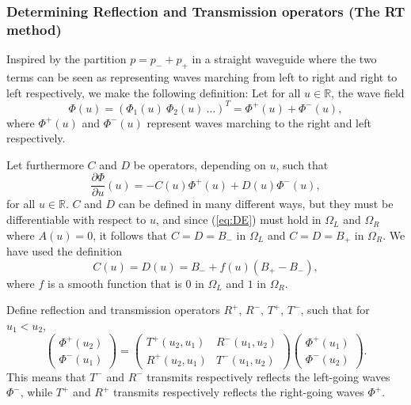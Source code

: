 \documentclass[numreferences]{kluwer}
\renewcommand{\Phi}{\varPhi}
\renewcommand{\vec}[1]{\bm{#1}}
\newcommand{\R}{\mathbb R}
\renewcommand{\Phi}{\varPhi}
\begin{document}
\subsubsection{Determining Reflection and Transmission operators (The
  RT method)}
\label{sec:RT}



Inspired by the partition $p=p_-+p_+$ in a straight waveguide
where the two terms can be seen as representing waves marching from
left to right and right to left respectively, we make the following
definition: Let for all $u\in\R$, the wave field 
\begin{equation}
  \label{eq:Phipart1}
  \vec\Phi(u)=(\Phi_1(u)\ \Phi_2(u)\ \dots)^T
  =\vec\Phi^+(u)+\vec\Phi^-(u), 
\end{equation}
where $\vec\Phi^+(u)$ and $\vec\Phi^-(u)$ represent waves marching to
the right and left respectively.

Let furthermore $C$ and $D$ be operators, depending on $u$, such that
\begin{equation}
  \label{eq:plusminustodiff}
    \dfrac{\partial\vec\Phi}{\partial u}(u)=
    -C(u)\vec\Phi^+(u)+D(u)\vec\Phi^-(u),
\end{equation}
for all $u\in\R$. $C$ and $D$ can be defined in many different ways,
but they must be differentiable with respect to $u$, and since
(\ref{eq:DE}) must hold in $\Omega_L$ and $\Omega_R$ where $A(u)=0$,
it follows that $C=D=B_-$ in $\Omega_L$ and $C=D=B_+$ in
$\Omega_R$. We have used the definition
\begin{equation}
  \label{eq:CD}
  C(u)=D(u)=B_-+f(u)(B_+-B_-),
\end{equation}
where $f$ is a smooth function that is $0$ in $\Omega_L$ and $1$ in
$\Omega_R$. 

Define reflection and transmission
operators $R^+$, $R^-$, $T^+$, $T^-$, such that for $u_1<u_2$,
\begin{equation}
  \label{eq:RT}
  \begin{pmatrix}
    \vec\Phi^+(u_2)\\
    \vec\Phi^-(u_1)
  \end{pmatrix}=
  \begin{pmatrix}
    T^+(u_2,u_1)&R^-(u_1,u_2)\\
    R^+(u_2,u_1)&T^-(u_1,u_2)
  \end{pmatrix}
  \begin{pmatrix}
    \vec\Phi^+(u_1)\\
    \vec\Phi^-(u_2)
  \end{pmatrix}.
\end{equation}
This means that $T^-$ and $R^-$ transmits respectively reflects the
left-going waves $\vec\Phi^-$, while $T^+$ and $R^+$ transmits
respectively reflects the right-going waves $\vec\Phi^+$.
\end{document}
